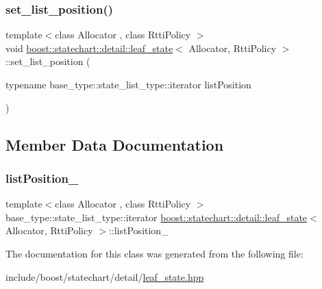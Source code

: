 \mbox{\label{classboost_1_1statechart_1_1detail_1_1leaf__state_a01ee6156bd6db979c04948260c587131}} 
\subsubsection{\texorpdfstring{set\+\_\+list\+\_\+position()}{set\_list\_position()}}
{\footnotesize\ttfamily template$<$class Allocator , class Rtti\+Policy $>$ \\
void \mbox{\hyperlink{classboost_1_1statechart_1_1detail_1_1leaf__state}{boost\+::statechart\+::detail\+::leaf\+\_\+state}}$<$ Allocator, Rtti\+Policy $>$\+::set\+\_\+list\+\_\+position (\begin{DoxyParamCaption}\item[{typename base\+\_\+type\+::state\+\_\+list\+\_\+type\+::iterator}]{list\+Position }\end{DoxyParamCaption})\hspace{0.3cm}{\ttfamily [inline]}}



\subsection{Member Data Documentation}
\mbox{\label{classboost_1_1statechart_1_1detail_1_1leaf__state_aa6c9ac2a0b6ecd2b87cd70795a8899e1}} 
\subsubsection{\texorpdfstring{list\+Position\+\_\+}{listPosition\_}}
{\footnotesize\ttfamily template$<$class Allocator , class Rtti\+Policy $>$ \\
base\+\_\+type\+::state\+\_\+list\+\_\+type\+::iterator \mbox{\hyperlink{classboost_1_1statechart_1_1detail_1_1leaf__state}{boost\+::statechart\+::detail\+::leaf\+\_\+state}}$<$ Allocator, Rtti\+Policy $>$\+::list\+Position\+\_\+\hspace{0.3cm}{\ttfamily [private]}}



The documentation for this class was generated from the following file\+:\begin{DoxyCompactItemize}
\item 
include/boost/statechart/detail/\mbox{\hyperlink{leaf__state_8hpp}{leaf\+\_\+state.\+hpp}}\end{DoxyCompactItemize}
